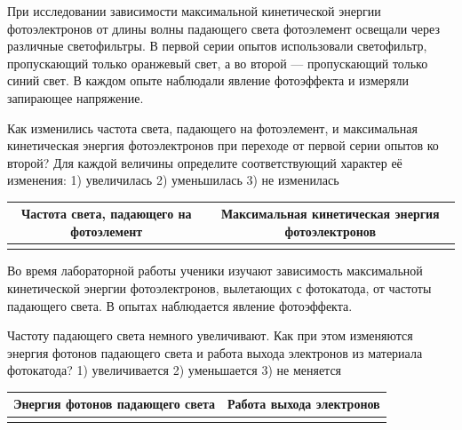 \begin{taskbasic}[code={\label{task:photo_orange_to_blue_freq_and_ek}}]
При исследовании зависимости максимальной кинетической энергии фотоэлектронов от длины волны падающего света фотоэлемент освещали через различные светофильтры. В первой серии опытов использовали светофильтр, пропускающий только оранжевый свет, а во второй --- пропускающий только синий свет. В каждом опыте наблюдали явление фотоэффекта и измеряли запирающее напряжение.

Как изменились частота света, падающего на фотоэлемент, и максимальная кинетическая энергия фотоэлектронов при переходе от первой серии опытов ко второй? Для каждой величины определите соответствующий характер её изменения:
1) увеличилась
2) уменьшилась
3) не изменилась

\nopagebreak\smallskip
\begin{center}
\small
\begin{tabular}{|c|c|}
\hline
Частота света, падающего на фотоэлемент & Максимальная кинетическая энергия фотоэлектронов \\ \hline
 & \\ \hline
\end{tabular}
\end{center}

\end{taskbasic}

\begin{taskbasic}[code={\label{task:photo_freq_inc_ephoton_and_work}}]
Во время лабораторной работы ученики изучают зависимость максимальной кинетической энергии фотоэлектронов, вылетающих с фотокатода, от частоты падающего света. В опытах наблюдается явление фотоэффекта.

Частоту падающего света немного увеличивают. Как при этом изменяются энергия фотонов падающего света и работа выхода электронов из материала фотокатода?
1) увеличивается
2) уменьшается
3) не меняется

\nopagebreak\smallskip
\begin{center}
\small
\begin{tabular}{|c|c|}
\hline
Энергия фотонов падающего света & Работа выхода электронов \\ \hline
 & \\ \hline
\end{tabular}
\end{center}

\end{taskbasic}


